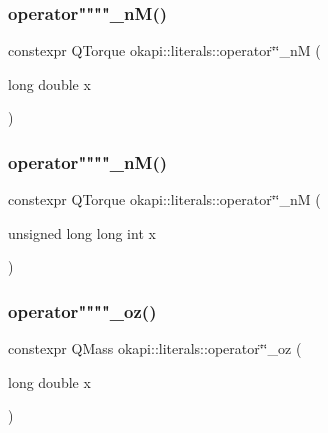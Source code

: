 \mbox{\label{namespaceokapi_1_1literals_ac65b950fcec6f63f51fb8aa139cd43ec}} 
\subsubsection{\texorpdfstring{operator""""\_nM()}{operator""\_nM()}\hspace{0.1cm}{\footnotesize\ttfamily [1/2]}}
{\footnotesize\ttfamily constexpr Q\+Torque okapi\+::literals\+::operator\char`\"{}\char`\"{}\+\_\+nM (\begin{DoxyParamCaption}\item[{long double}]{x }\end{DoxyParamCaption})}

\mbox{\label{namespaceokapi_1_1literals_a433bada2f177e78607acb15e2953668c}} 
\subsubsection{\texorpdfstring{operator""""\_nM()}{operator""\_nM()}\hspace{0.1cm}{\footnotesize\ttfamily [2/2]}}
{\footnotesize\ttfamily constexpr Q\+Torque okapi\+::literals\+::operator\char`\"{}\char`\"{}\+\_\+nM (\begin{DoxyParamCaption}\item[{unsigned long long int}]{x }\end{DoxyParamCaption})}

\mbox{\label{namespaceokapi_1_1literals_a8d9009d2400cba754b84e5e6ad9e8aa7}} 
\subsubsection{\texorpdfstring{operator""""\_oz()}{operator""\_oz()}\hspace{0.1cm}{\footnotesize\ttfamily [1/2]}}
{\footnotesize\ttfamily constexpr Q\+Mass okapi\+::literals\+::operator\char`\"{}\char`\"{}\+\_\+oz (\begin{DoxyParamCaption}\item[{long double}]{x }\end{DoxyParamCaption})}

